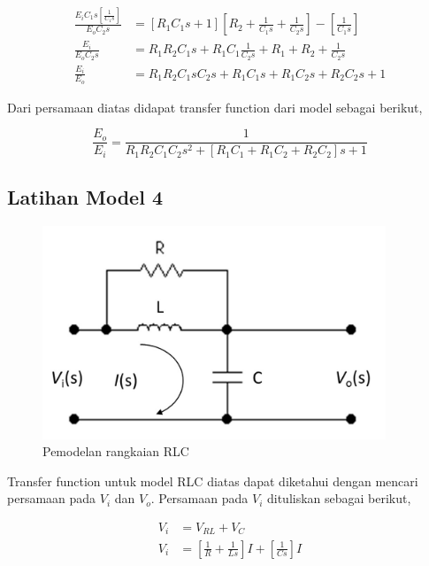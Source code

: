 \documentclass[12pt]{journal}
\begin{document}
\begin{equation*}
    \begin{split}
        \frac{E_iC_1s[\frac{1}{C_1s}]}{E_oC_2s} &= [R_1C_1s+1][R_2+\frac{1}{C_1s}+\frac{1}{C_2s}]-[\frac{1}{C_1s}] \\[5pt]
        \frac{E_i}{E_oC_2s} &= R_1R_2C_1s+R_1C_1\frac{1}{C_2s}+R_1+R_2+\frac{1}{C_2s} \\[5pt]
        \frac{E_i}{E_o} &= R_1R_2C_1sC_2s+R_1C_1s+R_1C_2s+R_2C_2s+1
    \end{split}
\end{equation*}

Dari persamaan diatas didapat transfer function dari model sebagai berikut,

\begin{equation}
    \frac{E_o}{E_i} = \frac{1}{R_1R_2C_1C_2s^2+[R_1C_1+R_1C_2+R_2C_2]s+1}
\end{equation}

\pagebreak

\subsection{Latihan Model 4}

\begin{figure}[H]
    \centering
    \includegraphics{model_nomor_4.png}
    \caption{Pemodelan rangkaian RLC}
    \label{soal_nomor_4}
\end{figure}
 
 Transfer function untuk model RLC diatas dapat diketahui dengan mencari persamaan pada $V_i$ dan $V_o$. Persamaan pada $V_i$ dituliskan sebagai berikut,
 
 \begin{equation}
     \begin{split}
         V_i &= V_{RL}+V_C \\[5pt]
         V_i &= [\frac{1}{R}+\frac{1}{Ls}]I+[\frac{1}{Cs}]I
     \end{split}
 \end{equation}
 
\end{document}
